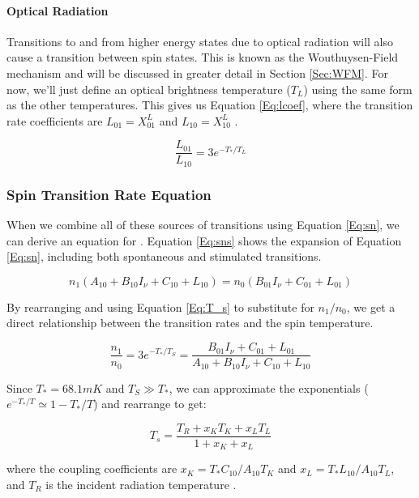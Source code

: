 \paragraph{Optical Radiation}
Transitions to and from higher energy states due to optical radiation will also cause a transition between spin states. This is known as the Wouthuysen-Field mechanism \cite{wouthuysen_1952}\cite{field_1958} and will be discussed in greater detail in Section \ref{Sec:WFM}. For now, we'll just define an optical brightness temperature ($T_L$) using the same form as the other temperatures. This gives us Equation \ref{Eq:lcoef}, where the transition rate coefficients are $L_{01} = X^L_{01}$ and $L_{10} = X^L_{10}$ \cite{field_1958}. 

\begin{equation} \label{Eq:lcoef}
\frac{L_{01}}{L_{10}} = 3 e^{-T_*/T_L}
\end{equation}

\subsubsection{Spin Transition Rate Equation}
When we combine all of these sources of transitions using Equation \ref{Eq:sn}, we can derive an equation for \ts. Equation \ref{Eq:sns} shows the expansion of Equation \ref{Eq:sn}, including both spontaneous and stimulated transitions. 

\begin{equation}\label{Eq:sns}
n_1(A_{10} + B_{10} I_\nu + C_{10} + L_{10}) = n_0 (B_{01} I_\nu + C_{01} + L_{01})
\end{equation}

By rearranging and using Equation \ref{Eq:T_s} to substitute for $n_1/n_0$, we get a direct relationship between the transition rates and the spin temperature. 

\begin{equation}
\frac{n_1}{n_0} = 3 e^{-T_*/T_S} = \frac{B_{01} I_\nu + C_{01}+ L_{01}}{A_{10}+ B_{10} I_\nu + C_{10} +L_{10}}
\end{equation}

Since $T_* = 68.1 mK$ and $T_S \gg T_*$, we can approximate the exponentials ($e^{-T_*/T} \simeq 1-T_*/T$) and rearrange to get:

\begin{equation}\label{Eq:dT_s}
T_s = \frac{T_{R} + x_K T_{K} + x_{L} T_{L}}{1+x_K +x_{L}}
\end{equation}

where the coupling coefficients are $x_K = T_* C_{10}/A_{10} T_K$ and $x_L = T_* L_{10} / A_{10} T_L$, and $T_R$ is the incident radiation temperature \cite{field_1958}.

